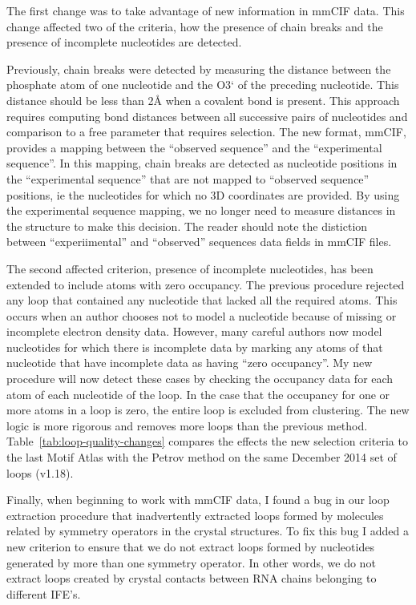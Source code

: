 The first change was to take advantage of new information in mmCIF data. This
change affected two of the criteria, how the presence of chain breaks and
the presence of incomplete nucleotides are detected.

Previously, chain breaks were detected by measuring the distance between the
phosphate atom of one nucleotide and the O3` of the preceding nucleotide. This
distance should be less than 2{\AA} \cite{Petrov2012} when a covalent bond is
present. This approach requires computing bond distances between all successive
pairs of nucleotides and comparison to a free parameter that requires selection.
The new format, mmCIF, provides a mapping between the ``observed sequence'' and
the ``experimental sequence''. In this mapping, chain breaks are detected as
nucleotide positions in the ``experimental sequence'' that are not mapped to
``observed sequence'' positions, ie the nucleotides for which no 3D coordinates are
provided. By using the experimental sequence mapping, we no longer need to
measure distances in the structure to make this decision. The reader should note
the distiction between ``experiimental'' and ``observed'' sequences data fields
in mmCIF files.

The second affected criterion, presence of incomplete nucleotides, has been
extended to include atoms with zero occupancy. The previous procedure rejected
any loop that contained any nucleotide that lacked all the required atoms. This
occurs when an author chooses not to model a nucleotide because of missing  or
incomplete electron density data. However, many careful authors now model
nucleotides for which there is incomplete data by marking any atoms of that
nucleotide that have incomplete data as having ``zero occupancy''. My new
procedure will now detect these cases by checking the occupancy data for each
atom of each nucleotide of the loop. In the case that the occupancy for one or
more atoms in a loop is zero, the entire loop is excluded from clustering. The
new logic is more rigorous and removes more loops than the previous method.
Table~\ref{tab:loop-quality-changes} compares the effects the new selection
criteria to the last Motif Atlas with the Petrov method on the same December 2014
set of loops (v1.18).

Finally, when beginning to work with mmCIF data, I found a bug in our loop
extraction procedure that inadvertently extracted loops formed by molecules
related by symmetry operators in the crystal structures. To fix this bug I added
a new criterion to ensure that we do not extract loops formed by nucleotides
generated by more than one symmetry operator. In other words, we do not extract
loops created by crystal contacts between RNA chains belonging to different
IFE's.

